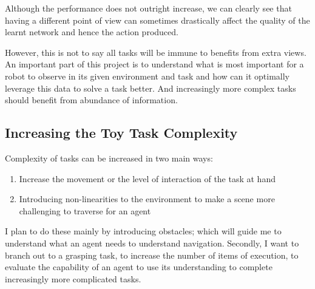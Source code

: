 Although the performance does not outright increase, we can clearly see that having a different point of view can sometimes drastically affect the quality of the learnt network and hence the action produced. \todo[color=purple]{}  

However, this is not to say all tasks will be immune to benefits from extra views. An important part of this project is to understand what is most important for a robot to observe in its given environment and task and how can it optimally leverage this data to solve a task better. And increasingly more complex tasks should benefit from abundance of information.

\subsection{Increasing the Toy Task Complexity}
Complexity of tasks can be increased in two main ways:
\begin{enumerate}
  \item Increase the movement or the level of interaction of the task at hand
  \item Introducing non-linearities to the environment to make a scene more challenging to traverse for an agent
\end{enumerate}
I plan to do these mainly by introducing obstacles; which will guide me to understand what an agent needs to understand navigation. Secondly, I want to branch out to a grasping task, to increase the number of items of execution, to evaluate the capability of an agent to use its understanding to complete increasingly more complicated tasks.

